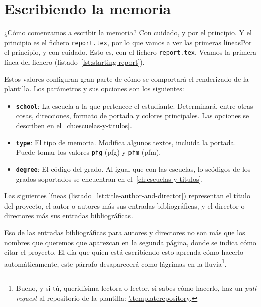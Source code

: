 \documentclass[%
    school=etsisi,%
    degree=61TI,%
]{upm-report}
\begin{document}
\chapter{Escribiendo la memoria}

¿Cómo comenzamos a escribir la memoria? Con cuidado, y por el principio.
Y el principio es el fichero \texttt{report.tex}, por lo que vamos a ver
las primeras líneasPor el principio, y con cuidado. Esto es, con el fichero \texttt{report.tex}. Veamos la primera línea del fichero (listado~\ref{lst:starting-report}).



Estos valores configuran gran parte de cómo se comportará el renderizado
de la plantilla. Los parámetros y sus opciones son los siguientes:

\begin{itemize}
    \item \textbf{\texttt{school}}: La escuela a la que pertenece el
        estudiante. Determinará, entre otras cosas, direcciones, formato
        de portada y colores principales. Las opciones se describen en
        el~\autoref{ch:escuelas-y-titulos}.
    \item \textbf{\texttt{type}}: El tipo de memoria. Modifica algunos textos, incluida la portada. Puede tomar los valores \texttt{pfg} (\acrlong{pfg}) y \texttt{pfm}  (\acrlong{pfm}).
    \item \textbf{\texttt{degree}}: El código del grado. Al igual que
    con las escuelas, lo scódigos de los grados soportados se encuentran
    en el~\autoref{ch:escuelas-y-titulos}.
\end{itemize}

Las siguientes líneas (listado~\ref{lst:title-author-and-director})
representan el título del proyecto, el autor o autores más sus entradas
bibliográficas, y el director o directores más sus entradas
bibliográficas.



Eso de las entradas bibliográficas para autores y directores no son más
que los nombres que queremos que aparezcan en la segunda página, donde
se indica cómo citar el proyecto. El día que quien está escribiendo esto
aprenda cómo hacerlo automáticamente, este párrafo desaparecerá como
lágrimas en la lluvia\footnote{Bueno, y si tú, queridísima lectora o
lector, si sabes cómo hacerlo, haz un \textit{pull request} al
repositorio de la plantilla: \url{\templaterepository}.}.
\end{document}
